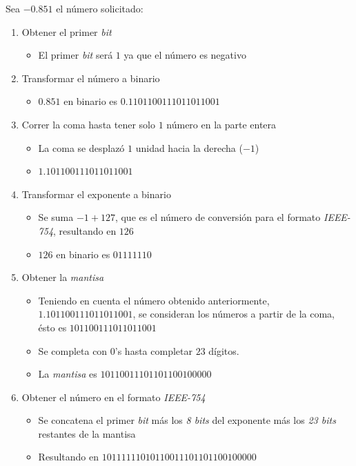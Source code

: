 \documentclass[12pt]{article}
\begin{document}
Sea $-0.851$ el número solicitado:
\begin{enumerate}
    \setlength{\parskip}{-8pt}
    \item Obtener el primer \textit{bit} 
        \begin{itemize}
            \setlength{\parskip}{-8pt}
            \item El primer \textit{bit} será $1$ ya que el número es negativo
        \end{itemize}
    \item Transformar el número a binario
        \begin{itemize}
            \setlength{\parskip}{-8pt}
            \item $0.851$ en binario es $0.1101100111011011001$
        \end{itemize}
    \item Correr la coma hasta tener solo $1$ número en la parte entera
        \begin{itemize}
            \setlength{\parskip}{-8pt}
            \item La coma se desplazó $1$ unidad hacia la derecha ($-1$)
            \item $1.101100111011011001$
        \end{itemize}
    \item Transformar el exponente a binario
        \begin{itemize}
            \setlength{\parskip}{-8pt}
            \item Se suma $-1 + 127$, que es el número de conversión para el
                formato \textit{IEEE-754}, resultando en $126$
            \item $126$ en binario es $01111110$
        \end{itemize}
    \item Obtener la \textit{mantisa} 
        \begin{itemize}
            \setlength{\parskip}{-8pt}
            \item Teniendo en cuenta el número obtenido anteriormente, 
                $1.101100111011011001$, se consideran los números a partir de 
                la coma, ésto es $101100111011011001$
            \item Se completa con $0$'s hasta completar $23$ dígitos.
            \item La \textit{mantisa} es $10110011101101100100000$
        \end{itemize}
    \item Obtener el número en el formato \textit{IEEE-754} 
        \begin{itemize}
            \setlength{\parskip}{-8pt}
            \item Se concatena el primer \textit{bit} más los \textit{8 bits} 
                del exponente más los \textit{23 bits} restantes de la mantisa
            \item Resultando en $10111111010110011101101100100000$
        \end{itemize}
\end{enumerate}

\clearpage
\printbibliography
\end{document}
